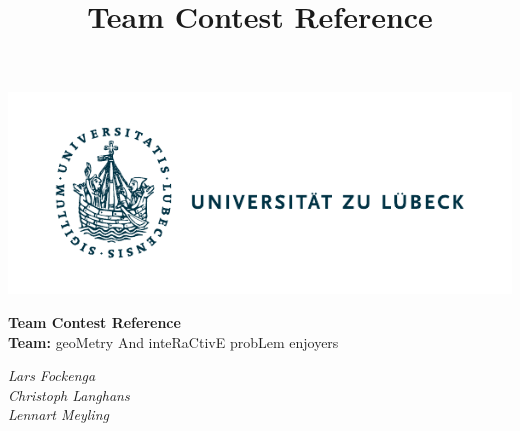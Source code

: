 \documentclass[10pt,a4paper,ngerman,oneside,]{article}
\title{Team Contest Reference}
\author{\university}
\newcommand\teammembers{Lars Fockenga\\ Christoph Langhans\\ Lennart Meyling}
\newcommand\teamname{geoMetry And inteRaCtivE probLem enjoyers}
\begin{document}
\vspace{-5mm}
\begin{center}
	\begin{minipage}{0.3\textwidth}
	  \includegraphics[scale=.8,clip,trim=.4cm 0cm 6.4cm 0cm,scale=0.89]{img/logo_uzl.pdf}
    \end{minipage}
	\begin{minipage}{0.35\textwidth}
      \begin{center}
	    \LARGE{\bfseries Team Contest Reference}\\
        \textbf{Team:} {\teamname}
      \end{center}
    \end{minipage}
	\begin{minipage}{0.3\textwidth}
      \flushright
      \itshape\teammembers
    \end{minipage}
\end{center}
\thispagestyle{fancy}
\tableofcontents
\end{document}
